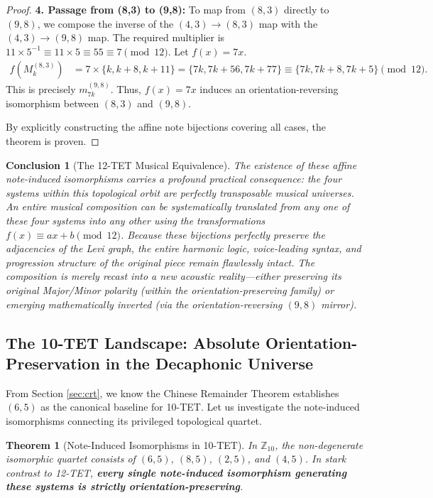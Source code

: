 \documentclass[11pt,letterpaper]{amsart}
\newcommand{\Z}{\mathbb{Z}}
\newtheorem{theorem}{Theorem}
\newtheorem{conclusion}{Conclusion}
\begin{document}
\begin{proof}
\textbf{4. Passage from (8,3) to (9,8):}
To map from $(8,3)$ directly to $(9,8)$, we compose the inverse of the $(4,3)\to(8,3)$ map with the $(4,3)\to(9,8)$ map. The required multiplier is $11 \times 5^{-1} \equiv 11 \times 5 \equiv 55 \equiv 7 \pmod{12}$. Let $f(x) = 7x$.
\begin{align*}
    f(M_k^{(8,3)}) &= 7 \times \{k, k+8, k+11\} = \{7k, 7k+56, 7k+77\} \equiv \{7k, 7k+8, 7k+5\} \pmod{12}.
\end{align*}
This is precisely $m_{7k}^{(9,8)}$. Thus, $f(x)=7x$ induces an orientation-reversing isomorphism between $(8,3)$ and $(9,8)$.

By explicitly constructing the affine note bijections covering all cases, the theorem is proven.
\end{proof}

\begin{conclusion}[The 12-TET Musical Equivalence]
The existence of these affine note-induced isomorphisms carries a profound practical consequence: the four systems within this topological orbit are perfectly transposable musical universes. An entire musical composition can be systematically translated from any one of these four systems into any other using the transformations $f(x) \equiv ax+b \pmod{12}$. Because these bijections perfectly preserve the adjacencies of the Levi graph, the entire harmonic logic, voice-leading syntax, and progression structure of the original piece remain flawlessly intact. The composition is merely recast into a new acoustic reality—either preserving its original Major/Minor polarity (within the orientation-preserving family) or emerging mathematically inverted (via the orientation-reversing $(9,8)$ mirror).
\end{conclusion}


\subsection{The 10-TET Landscape: Absolute Orientation-Preservation in the Decaphonic Universe}

From Section \ref{sec:crt}, we know the Chinese Remainder Theorem establishes $(6,5)$ as the canonical baseline for 10-TET. Let us investigate the note-induced isomorphisms connecting its privileged topological quartet. 

\begin{theorem}[Note-Induced Isomorphisms in 10-TET]
In $\Z_{10}$, the non-degenerate isomorphic quartet consists of $(6,5)$, $(8,5)$, $(2,5)$, and $(4,5)$. In stark contrast to 12-TET, \textbf{every single note-induced isomorphism generating these systems is strictly orientation-preserving}. 
\end{theorem}
\end{document}
